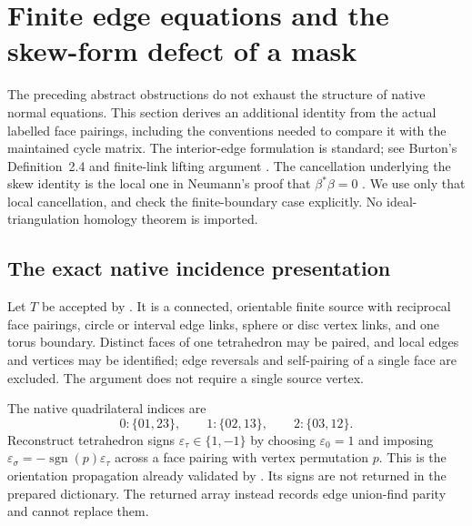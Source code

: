 \section{Finite edge equations and the skew-form defect of a mask}
\label{sec:native-edge-isotropy}

The preceding abstract obstructions do not exhaust the structure of native
normal equations.  This section derives an additional identity from the
actual labelled face pairings, including the conventions needed to compare
it with the maintained cycle matrix.  The interior-edge formulation is
standard; see Burton's Definition~2.4 and finite-link lifting argument
\cite{edge-burton}.  The cancellation underlying the skew identity is the
local one in Neumann's proof that $\beta^*\beta=0$ \cite{edge-neumann}.
We use only that local cancellation, and check the finite-boundary case
explicitly.  No ideal-triangulation homology theorem is imported.

\subsection{The exact native incidence presentation}

Let $T$ be accepted by .  It is a
connected, orientable finite source with reciprocal face pairings, circle
or interval edge links, sphere or disc vertex links, and one torus boundary.
Distinct faces of one tetrahedron may be paired, and local edges and vertices
may be identified; edge reversals and self-pairing of a single face are
excluded.  The argument does not require a single source vertex.

The native quadrilateral indices are
\[
 0:\{01,23\},\qquad 1:\{02,13\},\qquad 2:\{03,12\}.
\]
Reconstruct tetrahedron signs $\varepsilon_\tau\in\{1,-1\}$ by choosing
$\varepsilon_0=1$ and imposing
$\varepsilon_\sigma=-\operatorname{sgn}(p)\varepsilon_\tau$ across a face
pairing with vertex permutation $p$.  This is the orientation propagation
already validated by .  Its signs are not returned in the
prepared dictionary.  The returned  array instead
records edge union-find parity and cannot replace them.

